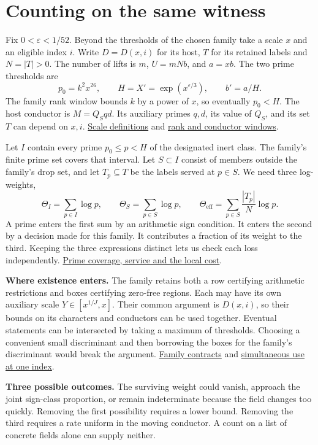 \documentclass[12pt,letterpaper]{article}
\newcommand{\orig}[3]{\href{https://github.com/nousentllc/riemann-hypothesis/blob/40e56bab026552e089d7afcfeff08d2defb9c005/src/#1.lean\#L#2}{#3}}
\newcommand{\para}[1]{\par\medskip\noindent\textbf{#1}\quad}
\newcommand{\pagepart}[1]{\clearpage\section{#1}}
\newcommand{\eff}{\mathrm{eff}}
\begin{document}
\pagepart{Counting on the same witness}
Fix \(0<\varepsilon<1/52\). Beyond the thresholds of the chosen family take a scale \(x\) and an eligible index \(i\). Write \(D=D(x,i)\) for its host, \(T\) for its retained labels and \(N=|T|>0\). The number of lifts is \(m\), \(U=mNb\), and \(a=xb\). The two prime thresholds are
\[
 p_0=k^2x^{26},\qquad H=X'=\exp(x^{\varepsilon/3}),\qquad b'=a/H .
\]
The family rank window bounds \(k\) by a power of \(x\), so eventually \(p_0<H\). The host conductor is \(M=Q_Sqd\). Its auxiliary primes \(q,d\), its value of \(Q_S\), and its set \(T\) can depend on \(x,i\).
\orig{Formalism/LocalRingCardinality/DataParams₂}{29}{Scale definitions} and
\orig{Development/AbelianVarietyTheory/Definitions/GlobalTwisting/PairRowIffQdRows}{28}{rank and conductor windows}.

Let \(I\) contain every prime \(p_0\le p<H\) of the designated inert class. The family's finite prime set covers that interval. Let \(S\subset I\) consist of members outside the family's drop set, and let \(T_p\subseteq T\) be the labels served at \(p\in S\). We need three log-weights,
\[
 \Theta_I=\sum_{p\in I}\log p,\qquad
 \Theta_S=\sum_{p\in S}\log p,\qquad
 \Theta_{\eff}=\sum_{p\in S}\frac{|T_p|}{N}\log p .
\]
A prime enters the first sum by an arithmetic sign condition. It enters the second by a decision made for this family. It contributes a fraction of its weight to the third. Keeping the three expressions distinct lets us check each loss independently. \orig{Formalism/LocalToGlobal/GlobalTheory/SuppSat}{26}{Prime coverage, service and the local cost}.

\para{Where existence enters.} The family retains both a row certifying arithmetic restrictions and boxes certifying zero-free regions. Each may have its own auxiliary scale \(Y\in[x^{1/J},x]\). Their common argument is \(D(x,i)\), so their bounds on its characters and conductors can be used together. Eventual statements can be intersected by taking a maximum of thresholds. Choosing a convenient small discriminant and then borrowing the boxes for the family's discriminant would break the argument. \orig{Formalism/SharpRestriction/GlobalSchurBounds/MainIn}{12}{Family contracts} and \orig{Formalism/SharpRestriction/GlobalSchurBounds/MainSup}{48}{simultaneous use at one index}.

\para{Three possible outcomes.} The surviving weight could vanish, approach the joint sign-class proportion, or remain indeterminate because the field changes too quickly. Removing the first possibility requires a lower bound. Removing the third requires a rate uniform in the moving conductor. A count on a list of concrete fields alone can supply neither.
\end{document}
